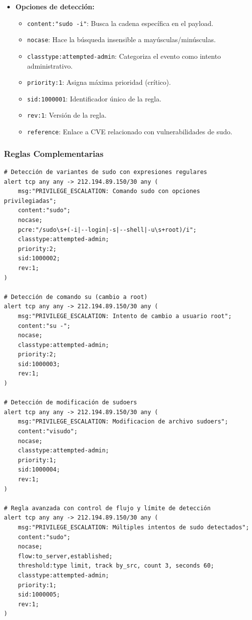 {\begin{itemize}
    \item \textbf{Opciones de detección:}
    \begin{itemize}
        \item \texttt{content:"sudo -i"}: Busca la cadena específica en el payload.
        \item \texttt{nocase}: Hace la búsqueda insensible a mayúsculas/minúsculas.
        \item \texttt{classtype:attempted-admin}: Categoriza el evento como intento administrativo.
        \item \texttt{priority:1}: Asigna máxima prioridad (crítico).
        \item \texttt{sid:1000001}: Identificador único de la regla.
        \item \texttt{rev:1}: Versión de la regla.
        \item \texttt{reference}: Enlace a CVE relacionado con vulnerabilidades de sudo.
    \end{itemize}
\end{itemize}

\subsubsection{Reglas Complementarias}

\begin{lstlisting}[language=snort, caption=Reglas adicionales para detección completa]
# Detección de variantes de sudo con expresiones regulares
alert tcp any any -> 212.194.89.150/30 any (
    msg:"PRIVILEGE_ESCALATION: Comando sudo con opciones privilegiadas";
    content:"sudo";
    nocase;
    pcre:"/sudo\s+(-i|--login|-s|--shell|-u\s+root)/i";
    classtype:attempted-admin;
    priority:2;
    sid:1000002;
    rev:1;
)

# Detección de comando su (cambio a root)
alert tcp any any -> 212.194.89.150/30 any (
    msg:"PRIVILEGE_ESCALATION: Intento de cambio a usuario root";
    content:"su -";
    nocase;
    classtype:attempted-admin;
    priority:2;
    sid:1000003;
    rev:1;
)

# Detección de modificación de sudoers
alert tcp any any -> 212.194.89.150/30 any (
    msg:"PRIVILEGE_ESCALATION: Modificacion de archivo sudoers";
    content:"visudo";
    nocase;
    classtype:attempted-admin;
    priority:1;
    sid:1000004;
    rev:1;
)

# Regla avanzada con control de flujo y límite de detección
alert tcp any any -> 212.194.89.150/30 any (
    msg:"PRIVILEGE_ESCALATION: Múltiples intentos de sudo detectados";
    content:"sudo";
    nocase;
    flow:to_server,established;
    threshold:type limit, track by_src, count 3, seconds 60;
    classtype:attempted-admin;
    priority:1;
    sid:1000005;
    rev:1;
)
\end{lstlisting}

}
